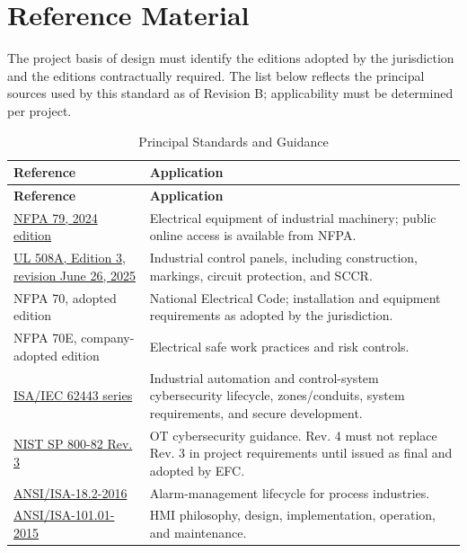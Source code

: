 \chapter{Reference Material}
The project basis of design must identify the editions adopted by the jurisdiction and the editions contractually required. The list below reflects the principal sources used by this standard as of Revision B; applicability must be determined per project.

\begin{longtable}{@{}p{4.2cm}p{8.6cm}@{}}
\caption{Principal Standards and Guidance}\label{tab:references}\\
\toprule \rowcolor{tblhead}\textbf{Reference} & \textbf{Application}\\ \midrule
\endfirsthead
\toprule \rowcolor{tblhead}\textbf{Reference} & \textbf{Application}\\ \midrule
\endhead
\href{https://link.nfpa.org/all-publications/79/2024}{NFPA 79, 2024 edition} & Electrical equipment of industrial machinery; public online access is available from NFPA.\\
\href{https://www.shopulstandards.com/ProductDetail.aspx?UniqueKey=48543}{UL 508A, Edition 3, revision June 26, 2025} & Industrial control panels, including construction, markings, circuit protection, and SCCR.\\
NFPA 70, adopted edition & National Electrical Code; installation and equipment requirements as adopted by the jurisdiction.\\
NFPA 70E, company-adopted edition & Electrical safe work practices and risk controls.\\
\href{https://www.isa.org/standards-and-publications/isa-standards/isa-iec-62443-series-of-standards}{ISA/IEC 62443 series} & Industrial automation and control-system cybersecurity lifecycle, zones/conduits, system requirements, and secure development.\\
\href{https://csrc.nist.gov/pubs/sp/800/82/r3/final}{NIST SP 800-82 Rev. 3} & OT cybersecurity guidance. Rev. 4 must not replace Rev. 3 in project requirements until issued as final and adopted by EFC.\\
\href{https://www.isa.org/products/ansi-isa-18-2-2016-management-of-alarm-systems-for}{ANSI/ISA-18.2-2016} & Alarm-management lifecycle for process industries.\\
\href{https://www.isa.org/products/isa-101-01-2015-human-machine-interfaces-for}{ANSI/ISA-101.01-2015} & HMI philosophy, design, implementation, operation, and maintenance.\\

\end{longtable}

